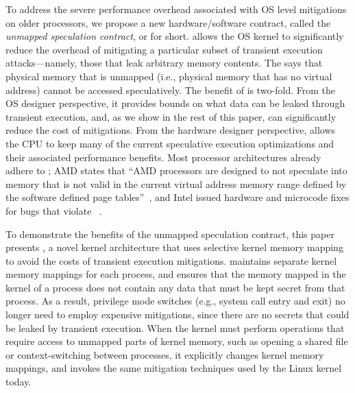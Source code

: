 
To address the severe performance overhead associated with OS level mitigations on older processors, we propose a new hardware/software contract, called the \emph{unmapped speculation contract}, or \contract{} for short.
\contract{} allows the OS kernel
to significantly reduce the overhead of mitigating a particular subset
of transient execution attacks---namely, those that leak arbitrary
memory contents.  The \contract{} says that physical memory that is
unmapped (i.e., physical memory that has no virtual address) cannot
be accessed speculatively.  The
benefit of \contract is two-fold.  From the OS designer perspective,
it provides bounds on what data can be leaked through transient execution,
and, as we show in the rest of this paper, can significantly reduce the
cost of mitigations.  From the hardware designer perspective, \contract
allows the CPU to keep many of the current speculative execution
optimizations and their associated performance benefits.  Most
processor architectures already adhere to \contract; AMD
states that ``AMD processors are designed to not speculate into memory
that is not valid in the current virtual address memory range defined
by the software defined page tables''~\cite[pg. 2]{amd:speculation},
and Intel issued hardware and microcode fixes for bugs that violate
\contract~\cite{intel:meltdown, intel:l1tf}.

To demonstrate the benefits of the unmapped speculation contract,
this paper presents \sys{}, a novel kernel architecture that uses
selective kernel memory mapping to avoid the costs of transient execution
mitigations.  \sys{} maintains separate kernel memory mappings for each
process, and ensures that the memory mapped in the kernel of a process
does not contain any data that must be kept secret from that process.
As a result, privilege mode switches (e.g., system call entry and exit)
no longer need to employ expensive mitigations, since there are no
secrets that could be leaked by transient execution.  When the \sys{}
kernel must perform operations that require access to unmapped parts
of kernel memory, such as opening a shared file or context-switching
between processes, it explicitly changes kernel memory mappings, and
invokes the same mitigation techniques used by the Linux kernel today.

